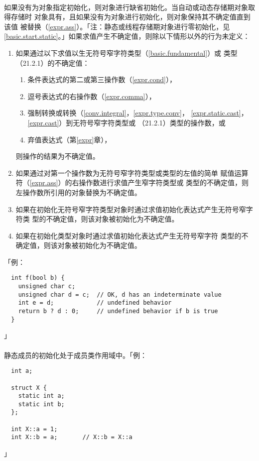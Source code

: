 \paragraph{}
如果没有为对象指定初始化，则对象进行缺省初始化。当自动或动态存储期对象取得存储时
对象具有，且如果没有为对象进行初始化，则对象保持其不确定值直到该值
被替换（\ref{expr.ass}）。「注：静态或线程存储期对象进行零初始化，见
\ref{basic.start.static}。」如果求值产生不确定值，则除以下情形以外的行为未定义：
\begin{enumerate}
  \item{如果通过以下求值以生无符号窄字符类型（\ref{basic.fundamental}）或
    类型（21.2.1）的不确定值：
    \begin{enumerate}
      \item{条件表达式的第二或第三操作数（\ref{expr.cond}），}
      \item{逗号表达式的右操作数（\ref{expr.comma}），}
      \item{强制转换或转换（\ref{conv.integral}，\ref{expr.type.conv}，
        \ref{expr.static.cast}，\ref{expr.cast}）到无符号窄字符类型或
        （21.2.1）类型的操作数，或}
      \item{弃值表达式（第\ref{expr}章），}
    \end{enumerate}
    则操作的结果为不确定值。
  }
  \item{如果通过对第一个操作数为无符号窄字符类型或类型的左值的简单
    赋值运算符（\ref{expr.ass}）的右操作数进行求值产生窄字符类型或
    类型的不确定值，则左操作数所引用的对象替换为不确定值。}
  \item{如果在初始化无符号窄字符类型对象时通过求值初始化表达式产生无符号窄字符类
    型的不确定值，则该对象被初始化为不确定值。}
  \item{如果在初始化类型对象时通过求值初始化表达式产生无符号窄字符
    类型的不确定值，则该对象被初始化为不确定值。}
\end{enumerate}
「例：
\begin{lstlisting}
  int f(bool b) {
    unsigned char c;
    unsigned char d = c;  // OK, d has an indeterminate value
    int e = d;            // undefined behavior
    return b ? d : 0;     // undefined behavior if b is true
  }
\end{lstlisting}」

\paragraph{}
静态成员的初始化处于成员类作用域中。「例：
\begin{lstlisting}
  int a;

  struct X {
    static int a;
    static int b;
  };

  int X::a = 1;
  int X::b = a;       // X::b = X::a
\end{lstlisting}」


